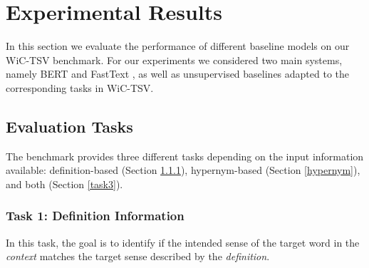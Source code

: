 \documentclass[11pt,a4paper]{article}
\begin{document}
\begin{table}
\centering
\setlength{\tabcolsep}{12.0pt}
\caption{\label{tab:human_performance} Average human accuracy for native English annotators, on different subsets of the dataset: general purpose, i.e., {WNT/WKT}, and the domain specific, i.e., {MSH}, {CTL}, and {CPS}.}
\end{table}


\section{Experimental Results}
\label{experiments}

In this section we evaluate the performance of different baseline models on our WiC-TSV benchmark. For our experiments we considered two main systems, namely BERT \cite{devlin-etal-2019-bert} and FastText \cite{joulin2017bag}, as well as unsupervised baselines adapted to the corresponding tasks in WiC-TSV. 

\subsection{Evaluation Tasks}
\label{tasks}

The benchmark provides three different tasks depending on the input information available: definition-based (Section \ref{definition}), hypernym-based (Section \ref{hypernym}), and both (Section \ref{task3}).

\subsubsection{Task 1: Definition Information}
\label{definition}
In this task, the goal is to identify if the intended sense of the target word in the {\it context} matches the target sense described by the {\it definition}.
\end{document}
